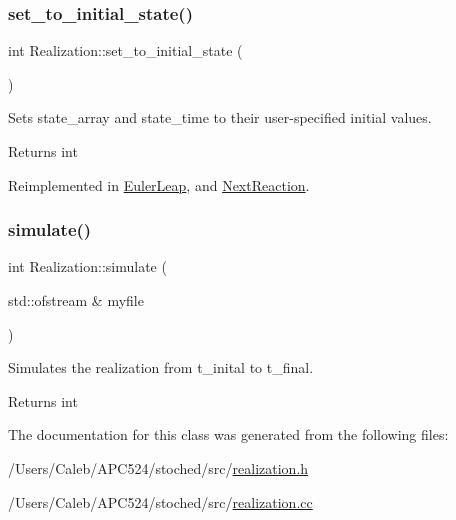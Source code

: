 \subsubsection{\texorpdfstring{set\+\_\+to\+\_\+initial\+\_\+state()}{set\_to\_initial\_state()}}
{\footnotesize\ttfamily int Realization\+::set\+\_\+to\+\_\+initial\+\_\+state (\begin{DoxyParamCaption}{ }\end{DoxyParamCaption})\hspace{0.3cm}{\ttfamily [virtual]}}



Sets state\+\_\+array and state\+\_\+time to their user-\/specified initial values. 

\begin{DoxyReturn}{Returns}
int 
\end{DoxyReturn}


Reimplemented in \hyperlink{class_euler_leap_a1a13929ea1ebf40e7357439968828f4b}{Euler\+Leap}, and \hyperlink{class_next_reaction_a0cc63c4ec9fe3f338472fff302f6d746}{Next\+Reaction}.

\mbox{\label{class_realization_a4e21bc7355e33c17d1401736b3c62413}} 
\subsubsection{\texorpdfstring{simulate()}{simulate()}}
{\footnotesize\ttfamily int Realization\+::simulate (\begin{DoxyParamCaption}\item[{std\+::ofstream \&}]{myfile }\end{DoxyParamCaption})}



Simulates the realization from t\+\_\+inital to t\+\_\+final. 

\begin{DoxyReturn}{Returns}
int 
\end{DoxyReturn}


The documentation for this class was generated from the following files\+:\begin{DoxyCompactItemize}
\item 
/\+Users/\+Caleb/\+A\+P\+C524/stoched/src/\hyperlink{realization_8h}{realization.\+h}\item 
/\+Users/\+Caleb/\+A\+P\+C524/stoched/src/\hyperlink{realization_8cc}{realization.\+cc}\end{DoxyCompactItemize}
